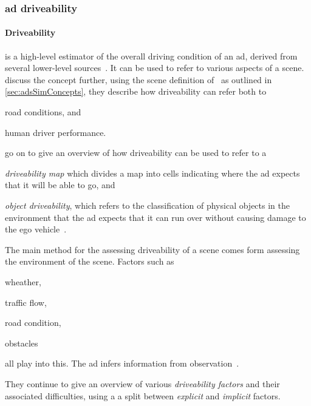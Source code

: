 \subsubsection*{\acrlong{ad} driveability}\label{sec:adsDrivability}

\paragraph{Driveability} is a high-level estimator of the overall driving
condition of an \acrshort{ad}, derived from several lower-level sources~\cite[3140]{safeToDrive}.
It can be used to refer to various aspects of a scene.
\citeauthor{safeToDrive} discuss the concept further, using the  scene definition
of~\citeauthor{scenes} as outlined in  \cref{sec:adsSimConcepts}, they describe
how driveability can refer both to \begin{inparaenum}
    \item road conditions, and
    \item human driver performance.
\end{inparaenum}
\citeauthor{safeToDrive} go on to give an overview of how driveability
can be used to refer to a \begin{inparaenum}\setcounter{enumi}{2}
    \item \textit{driveability map} which divides a map into
    cells indicating where the \acrshort{ad} expects that it will be able to go, and
    \item \textit{object driveability}, which refers to the classification of physical
    objects in the environment that the \acrshort{ad} expects that it can run over
    without causing damage to the ego vehicle~\cite[3135-3136]{safeToDrive}.
\end{inparaenum}

The main method for the assessing driveability of a scene comes form assessing the environment
of the scene. Factors such as \begin{inparaenum}
    \item wheather,
    \item traffic flow,
    \item road condition,
    \item obstacles
\end{inparaenum} all play into this. The \acrshort{ad} infers information from
observation~\cite[3136]{safeToDrive}.

They continue to give an overview of various \textit{driveability factors} and
their associated difficulties, using a a split between \textit{explicit} and
\textit{implicit} factors.

